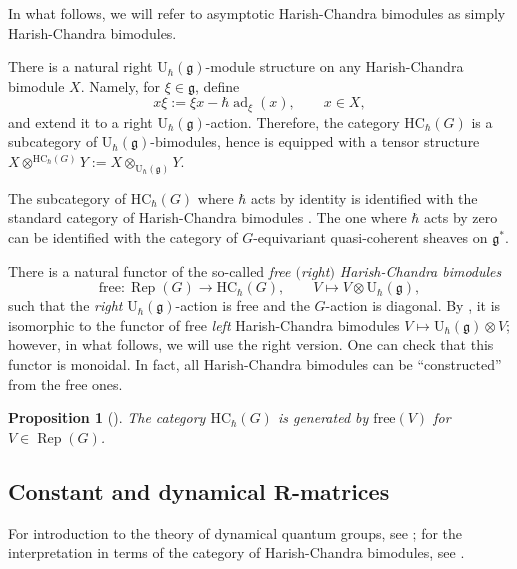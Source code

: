 \documentclass[pdftex]{sigma}
\numberwithin{equation}{section}
\newtheorem{Proposition}[Theorem]{Proposition}
{ \theoremstyle{definition}
	\newtheorem{Definition}[Theorem]{Definition}
	\newtheorem{Note}[Theorem]{Note}
	\newtheorem{Example}[Theorem]{Example}
	\newtheorem{Remark}[Theorem]{Remark} }
\newcommand{\U}{\mathrm{U}_{\hbar}}
\newcommand{\g}{\mathfrak{g}}
\DeclareMathOperator{\ad}{ad}
\newcommand{\free}{\mathrm{free}}
\newcommand{\HC}{\mathrm{HC}_{\hbar}}
\DeclareMathOperator{\Rep}{Rep}
\begin{document}
	In what follows, we will refer to asymptotic Harish-Chandra bimodules as simply Harish-Chandra bimodules.
	
	There is a natural right $\U(\g)$-module structure on any Harish-Chandra bimodule $X$. Namely, for $\xi \in\g$, define
	\begin{equation}
		\label{eq::left_action}
		x\xi := \xi x - \hbar \ad_{\xi}(x),\qquad x\in X,
	\end{equation}
	and extend it to a right $\U(\g)$-action. Therefore, the category $\HC(G)$ is a subcategory of $\U(\g)$-bimodules, hence is equipped with a tensor structure
$
	X \otimes^{\HC(G)} Y := X \otimes_{\U(\g)} Y$.
	
	\begin{Remark}
		The subcategory of $\HC(G)$ where $\hbar$ acts by identity is identified with the standard category of Harish-Chandra bimodules \cite[Definition 5.2]{BernsteinGelfand}. The one where $\hbar$ acts by zero can be identified with the category of $G$-equivariant quasi-coherent sheaves on $\g^*$.
	\end{Remark}
	
	There is a natural functor of the so-called \emph{free $($right$)$ Harish-Chandra bimodules}
	\[
	\free \colon \Rep(G) \rightarrow \HC(G), \qquad V \mapsto V \otimes \U(\g),
	\]
	such that the \emph{right} $\U(\g)$-action is free and the $G$-action is diagonal. By \cite[equation~(28)]{KalmykovSafronov}, it is isomorphic to the functor of free \emph{left} Harish-Chandra bimodules $V \mapsto \U(\g) \otimes V$; however, in what follows, we will use the right version. One can check that this functor is monoidal. In fact, all Harish-Chandra bimodules can be ``constructed'' from the free ones.
	\begin{Proposition}[{\cite[Proposition 2.7]{KalmykovSafronov}}]
		\label{prop::hc_generators}
		The category $\HC(G)$ is generated by $\free(V)$ for $V \in \Rep(G)$.
	\end{Proposition}
	
	\subsection[Constant and dynamical R-matrices]{Constant and dynamical $\boldsymbol{R}$-matrices}
	\label{subsect::dynamica_r_mat}
	For introduction to the theory of dynamical quantum groups, see \cite{EtingofSchiffmann}; for the interpretation in terms of the category of Harish-Chandra bimodules, see \cite{KalmykovSafronov}.
	
\end{document}

